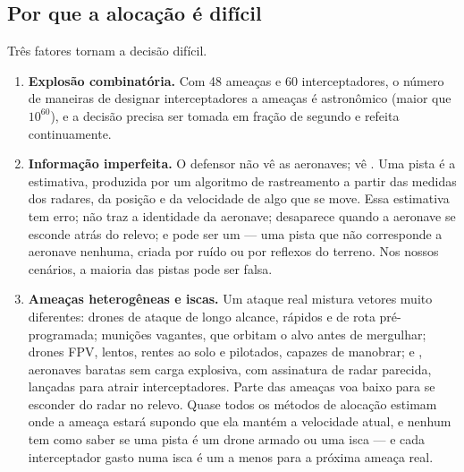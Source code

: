 \subsection{Por que a alocação é difícil}
Três fatores tornam a decisão difícil.
\begin{enumerate}
  \item \textbf{Explosão combinatória.} Com 48 ameaças e 60 interceptadores, o número de maneiras de designar
        interceptadores a ameaças é astronômico (maior que $10^{60}$), e a decisão precisa ser tomada em fração de
        segundo e refeita continuamente.
  \item \textbf{Informação imperfeita.} O defensor não vê as aeronaves; vê . Uma pista é a
        estimativa, produzida por um algoritmo de rastreamento a partir das medidas dos radares, da posição e da
        velocidade de algo que se move. Essa estimativa tem erro; não traz a identidade da aeronave; desaparece quando a
        aeronave se esconde atrás do relevo; e pode ser um  --- uma pista que não corresponde a
        aeronave nenhuma, criada por ruído ou por reflexos do terreno. Nos nossos cenários, a maioria das pistas pode ser
        falsa.
  \item \textbf{Ameaças heterogêneas e iscas.} Um ataque real mistura vetores muito diferentes: drones de ataque de
        longo alcance, rápidos e de rota pré-programada; munições vagantes, que orbitam o alvo antes de mergulhar; drones
        FPV, lentos, rentes ao solo e pilotados, capazes de manobrar; e , aeronaves baratas sem carga
        explosiva, com assinatura de radar parecida, lançadas para atrair interceptadores. Parte das ameaças voa baixo
        para se esconder do radar no relevo. Quase todos os métodos de alocação estimam onde a ameaça estará supondo que
        ela mantém a velocidade atual, e nenhum tem como saber se uma pista é um drone armado ou uma isca --- e cada
        interceptador gasto numa isca é um a menos para a próxima ameaça real.
\end{enumerate}

